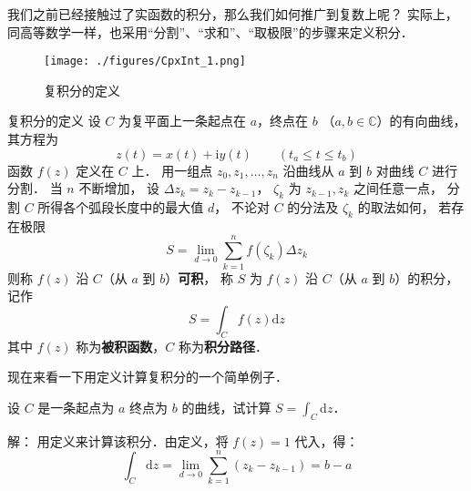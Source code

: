 
\begin{issues}
\end{issues}



我们之前已经接触过了实函数的积分，那么我们如何推广到复数上呢？ 实际上，同高等数学一样，也采用“分割”、“求和”、“取极限”的步骤来定义积分．

\begin{figure}[ht]
\centering
\texttt{[image: ./figures/CpxInt\_1.png]}
\caption{复积分的定义} \label{CpxInt_fig1}
\end{figure}

\begin{definition}{复积分的定义}
设 $C$ 为复平面上一条起点在 $a$，终点在 $b$ （$a,b\in\mathbb C$）的有向曲线， 其方程为
\begin{equation}
z(t)=x(t)+\mathrm{i} y(t) \qquad(t_a \leqslant t \leqslant t_b)
\end{equation}
函数 $f(z)$ 定义在 $C$ 上． 用一组点 $z_{0}, z_{1}, \dots, z_{n}$ 沿曲线从 $a$ 到 $b$ 对曲线 $C$ 进行分割． 当 $n$ 不断增加， 设 $\Delta z_{k}=z_{k}-z_{k-1}$， $\zeta_k$ 为 $z_{k-1},z_k$ 之间任意一点， 分割 $C$ 所得各个弧段长度中的最大值 $d$， 不论对 $C$ 的分法及 $\zeta_k$ 的取法如何， 若存在极限
\begin{equation}
S = \lim_{d \rightarrow 0} \sum_{k=1}^{n} f\left(\zeta_{k}\right) \Delta z_{k}
\end{equation}
则称 $f(z)$ 沿 $C $（从 $a$ 到 $b$）\textbf{可积}， 称 $S$ 为 $f(z)$ 沿 $C$（从 $a$ 到 $b$）的积分，记作
\begin{equation}
S=\int_{C} f(z) \mathrm{d} z
\end{equation}
其中 $f (z)$ 称为\textbf{被积函数}，$C$ 称为\textbf{积分路径}．
\end{definition}

现在来看一下用定义计算复积分的一个简单例子．
\begin{example}{}
设 $C$ 是一条起点为 $a$ 终点为 $b$ 的曲线，试计算 $\displaystyle S=\int_C\mathrm dz$．

解： 用定义来计算该积分．由定义，将 $f(z)=1$ 代入，得：
\begin{equation}
\int_{C} \mathrm{d} z=\lim _{d \rightarrow 0} \sum_{k=1}^{n}\left(z_{k}-z_{k-1}\right)= b-a
\end{equation}
\end{example}

